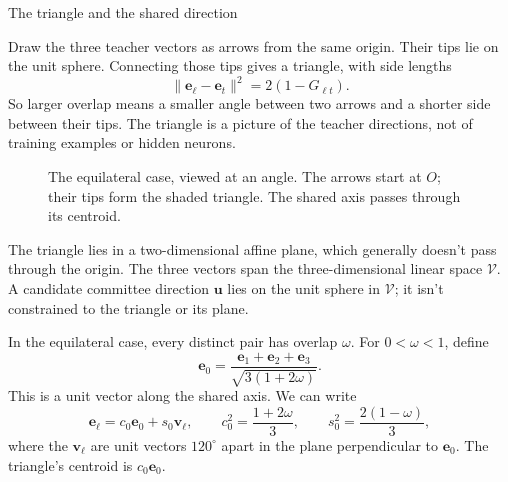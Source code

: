 \documentclass[11pt, reqno]{amsart}
\makeatletter
\def\section{\@startsection{section}{1}%
  \z@{.7\linespacing\@plus\linespacing}{.5\linespacing}%
  {\normalfont\scshape\centering}}
\theoremstyle{notestyle}
\theoremstyle{defstyle}
\makeatother
\begin{document}
\section{The triangle and the shared direction}

Draw the three teacher vectors as arrows from the same origin.
Their tips lie on the unit sphere. Connecting those tips gives a
triangle, with side lengths
\begin{equation}
 \|\mathbf e_\ell-\mathbf e_t\|^2=2(1-G_{\ell t}).
 \label{eq:iso-distance}
\end{equation}
So larger overlap means a smaller angle between two arrows and a
shorter side between their tips. The triangle is a picture of the
teacher directions, not of training examples or hidden neurons.

\begin{figure}[htbp]
\centering
{}
\caption{The equilateral case, viewed at an angle. The arrows start at
$O$; their tips form the shaded triangle. The shared axis passes
through its centroid.}
\end{figure}

The triangle lies in a two-dimensional affine plane, which generally
doesn't pass through the origin. The three vectors span the
three-dimensional linear space $\mathcal V$. A candidate committee
direction $\mathbf u$ lies on the unit sphere in $\mathcal V$; it
isn't constrained to the triangle or its plane.

In the equilateral case, every distinct pair has overlap $\omega$.
For $0<\omega<1$, define
\begin{equation}
 \mathbf e_0=\frac{\mathbf e_1+\mathbf e_2+\mathbf e_3}
 {\sqrt{3(1+2\omega)}}.
\end{equation}
This is a unit vector along the shared axis. We can write
\begin{equation}
 \mathbf e_\ell=c_0\mathbf e_0+s_0\mathbf v_\ell,\qquad
 c_0^2=\frac{1+2\omega}{3},\qquad
 s_0^2=\frac{2(1-\omega)}3,
\end{equation}
where the $\mathbf v_\ell$ are unit vectors $120^\circ$ apart in the
plane perpendicular to $\mathbf e_0$. The triangle's centroid is
$c_0\mathbf e_0$.
\end{document}
